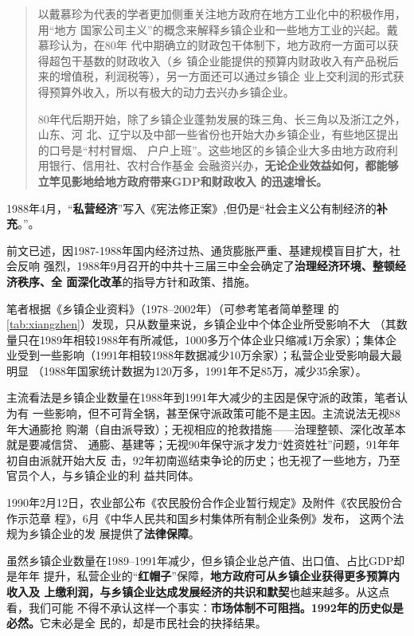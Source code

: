 \begin{quotation}
  以戴慕珍为代表的学者更加侧重关注地方政府在地方工业化中的积极作用，用“地方
  国家公司主义”的概念来解释乡镇企业和一些地方工业的兴起。戴慕珍认为，在80年
  代中期确立的财政包干体制下，地方政府一方面可以获得超包干基数的财政收入（乡
  镇企业能提供的预算内财政收入有产品税后来的增值税，利润税等），另一方面还可以通过乡镇企
  业上交利润的形式获得预算外收入，所以有极大的动力去兴办乡镇企业。

  80年代后期开始，除了乡镇企业蓬勃发展的珠三角、长三角以及浙江之外，山东、河
  北、辽宁以及中部一些省份也开始大办乡镇企业，有些地区提出的口号是“村村冒烟、
  户户上班”。这些地区的乡镇企业大多由地方政府利用银行、信用社、农村合作基金
  会融资兴办，\textbf{无论企业效益如何，都能够立竿见影地给地方政府带来GDP和财政收入
    的迅速增长。}
\end{quotation}

1988年4月，“\textbf{私营经济}”写入《宪法修正案》,但仍是“社会主义公有制经济的\textbf{补
充}。”。

前文已述，因1987-1988年国内经济过热、通货膨胀严重、基建规模盲目扩大，社会反响
强烈，1988年9月召开的中共十三届三中全会确定了\textbf{治理经济环境、整顿经济秩序、全
  面深化改革}的指导方针和政策、措施。

笔者根据《乡镇企业资料》（1978--2002年）（可参考笔者简单整理
的\cref{tab:xiangzhen}）发现，只从数量来说，乡镇企业中个体企业所受影响不大
（其数量只在1989年相较1988年有所减低，1000多万个体企业只缩减1万余家）；集体企
业受到一些影响（1991年相较1988年数据减少10万余家）；私营企业受影响最大最明显
（1988年国家统计数据为120万多，1991年不足85万，减少35余家）。

主流看法是乡镇企业数量在1988年到1991年大减少的主因是保守派的政策，笔者认为有
一些影响，但不可背全锅，甚至保守派政策可能不是主因。主流说法无视88年大通膨抢
购潮（自由派导致）；无视相应的抢救措施——治理整顿、深化改革本就是要减信贷、
通膨、基建等；无视90年保守派才发力“姓资姓社”问题，91年年初自由派就开始大反
击，92年初南巡结束争论的历史；也无视了一些地方，乃至官员个人，与乡镇企业的利
益共同体。


1990年2月12日，农业部公布《农民股份合作企业暂行规定》及附件《农民股份合作示范章
程》，6月《中华人民共和国乡村集体所有制企业条例》发布， 这两个法规为乡镇企业的发
展提供了\textbf{法律保障}。

虽然乡镇企业数量在1989--1991年减少，但乡镇企业总产值、出口值、占比GDP却是年年
提升，私营企业的“\textbf{红帽子}”保障，\textbf{地方政府可从乡镇企业获得更多预算内收入及
  上缴利润，与乡镇企业达成发展经济的共识和默契}也越来越多。从这点看，我们可能
不得不承认这样一个事实：\textbf{市场体制不可阻挡。1992年的历史似是必然。}它未必是全
民的，却是市民社会的抉择结果。


